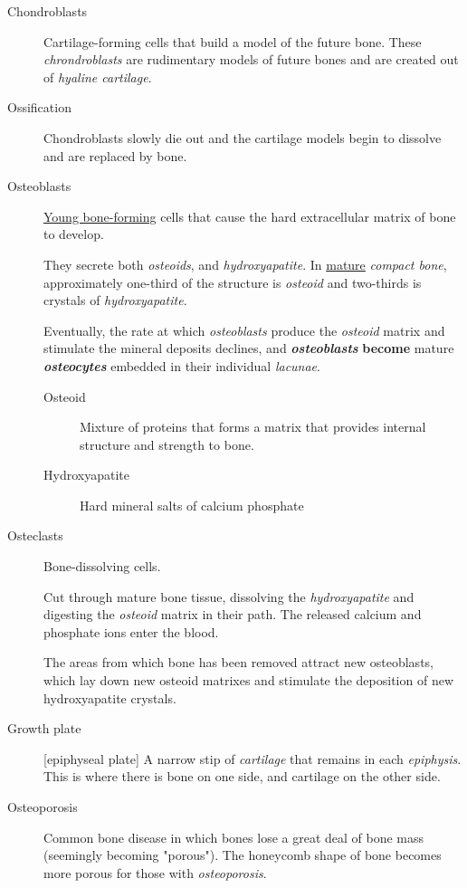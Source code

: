 \documentclass[11pt]{article}
\begin{document}
\begin{description}
\item[{Chondroblasts}] Cartilage-forming cells that build a model of the future
bone. These \emph{chrondroblasts} are rudimentary models of future bones and
are created out of \emph{hyaline cartilage}.

\item[{Ossification}] Chondroblasts slowly die out and the cartilage models
begin to dissolve and are replaced by bone.

\item[{Osteoblasts}] \uline{Young bone-forming} cells that cause the hard extracellular
matrix of bone to develop.

They secrete both \emph{osteoids}, and \emph{hydroxyapatite}. In \uline{mature} \emph{compact bone},
approximately one-third of the structure is \emph{osteoid} and two-thirds is
crystals of \emph{hydroxyapatite}.

Eventually, the rate at which \emph{osteoblasts} produce the \emph{osteoid}
matrix and stimulate the mineral deposits declines, and \emph{\textbf{osteoblasts}}
\textbf{become} mature \emph{\textbf{osteocytes}} embedded in their individual \emph{lacunae}.

\begin{description}
\item[{Osteoid}] Mixture of proteins that forms a matrix that provides
internal structure and strength to bone.

\item[{Hydroxyapatite}] Hard mineral salts of calcium phosphate
\end{description}

\item[{Osteclasts}] Bone-dissolving cells.

Cut through mature bone tissue, dissolving the \emph{hydroxyapatite} and
digesting the \emph{osteoid} matrix in their path. The released calcium and
phosphate ions enter the blood.

The areas from which bone has been removed attract new osteoblasts,
which lay down new osteoid matrixes and stimulate the deposition of new
hydroxyapatite crystals.

\item[{Growth plate}] [epiphyseal plate] A narrow stip of \emph{cartilage} that
remains in each \emph{epiphysis}. This is where there is bone on one side,
and cartilage on the other side.

\item[{Osteoporosis}] Common bone disease in which bones lose a great deal of
bone mass (seemingly becoming "porous"). The honeycomb shape of bone
becomes more porous for those with \emph{osteoporosis}.


\end{description}
\end{document}
